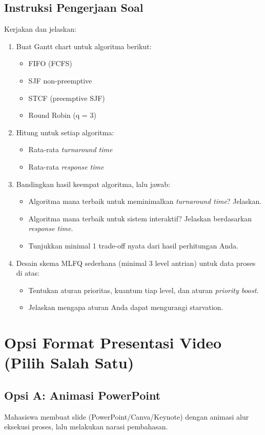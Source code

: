 \documentclass[12pt,a4paper]{article}
\begin{document}
\subsection*{Instruksi Pengerjaan Soal}
Kerjakan dan jelaskan:
\begin{enumerate}
    \item Buat Gantt chart untuk algoritma berikut:
    \begin{itemize}
        \item FIFO (FCFS)
        \item SJF non-preemptive
        \item STCF (preemptive SJF)
        \item Round Robin (q = 3)
    \end{itemize}
    \item Hitung untuk setiap algoritma:
    \begin{itemize}
        \item Rata-rata \textit{turnaround time}
        \item Rata-rata \textit{response time}
    \end{itemize}
    \item Bandingkan hasil keempat algoritma, lalu jawab:
    \begin{itemize}
        \item Algoritma mana terbaik untuk meminimalkan \textit{turnaround time}? Jelaskan.
        \item Algoritma mana terbaik untuk sistem interaktif? Jelaskan berdasarkan \textit{response time}.
        \item Tunjukkan minimal 1 trade-off nyata dari hasil perhitungan Anda.
    \end{itemize}
    \item Desain skema MLFQ sederhana (minimal 3 level antrian) untuk data proses di atas:
    \begin{itemize}
        \item Tentukan aturan prioritas, kuantum tiap level, dan aturan \textit{priority boost}.
        \item Jelaskan mengapa aturan Anda dapat mengurangi starvation.
    \end{itemize}
\end{enumerate}

\section{Opsi Format Presentasi Video (Pilih Salah Satu)}
\subsection*{Opsi A: Animasi PowerPoint}
Mahasiswa membuat slide (PowerPoint/Canva/Keynote) dengan animasi alur eksekusi proses, lalu melakukan narasi pembahasan.
\end{document}
